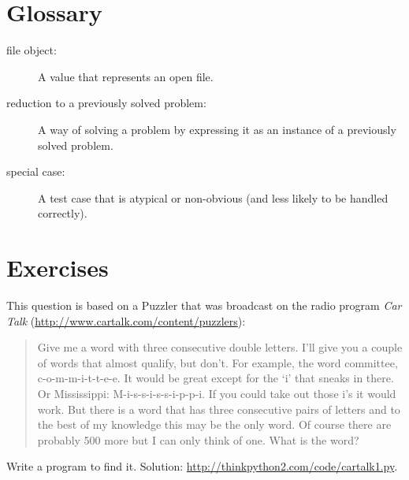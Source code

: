 \documentclass[10pt]{book}
\begin{document}
\section{Glossary}

\begin{description}

\item[file object:] A value that represents an open file.

\item[reduction to a previously solved problem:] A way of solving a
  problem by expressing it as an instance of a previously solved
  problem.  

\item[special case:] A test case that is atypical or non-obvious
(and less likely to be handled correctly).

\end{description}


\section{Exercises}

\begin{exercise}

This question is based on a Puzzler that was broadcast on the radio
program {\em Car Talk} 
(\url{http://www.cartalk.com/content/puzzlers}):

\begin{quote}
Give me a word with three consecutive double letters. I'll give you a
couple of words that almost qualify, but don't. For example, the word
committee, c-o-m-m-i-t-t-e-e. It would be great except for the `i' that
sneaks in there. Or Mississippi: M-i-s-s-i-s-s-i-p-p-i. If you could
take out those i's it would work. But there is a word that has three
consecutive pairs of letters and to the best of my knowledge this may
be the only word. Of course there are probably 500 more but I can only
think of one. What is the word?
\end{quote}

Write a program to find it.
Solution: \url{http://thinkpython2.com/code/cartalk1.py}.

\end{exercise}
\end{document}

